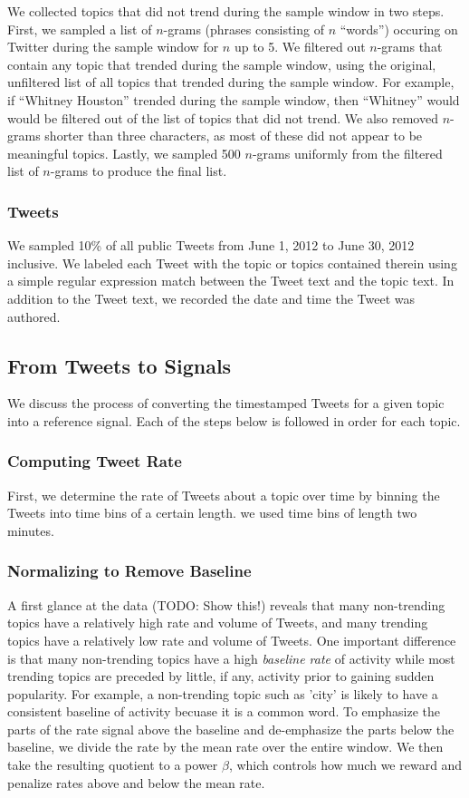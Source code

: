 We collected topics that did not trend during the sample window in two
steps. First, we sampled a list of $n$-grams (phrases consisting of $n$
``words'') occuring on Twitter during the sample window for $n$ up to 5. We
filtered out $n$-grams that contain any topic that trended during the sample
window, using the original, unfiltered list of all topics that trended during
the sample window. For example, if ``Whitney Houston'' trended during the sample
window, then ``Whitney'' would would be filtered out of the list of topics that
did not trend. We also removed $n$-grams shorter than three characters, as most
of these did not appear to be meaningful topics. Lastly, we sampled 500
$n$-grams uniformly from the filtered list of $n$-grams to produce the final
list.

\subsubsection{Tweets}
We sampled 10\% of all public Tweets from June 1, 2012 to June 30, 2012
inclusive. We labeled each Tweet with the topic or topics contained therein
using a simple regular expression match between the Tweet text and the topic
text. In addition to the Tweet text, we recorded the date and time the Tweet was
authored.

\subsection{From Tweets to Signals}
We discuss the process of converting the timestamped Tweets for a given topic
into a reference signal. Each of the steps below is followed in order for each
topic.

\subsubsection{Computing Tweet Rate}
First, we determine the rate of Tweets about a topic over time by binning the
Tweets into time bins of a certain length. we used time bins of length two
minutes. 

\subsubsection{Normalizing to Remove Baseline}
A first glance at the data (TODO: Show this!) reveals that many non-trending
topics have a relatively high rate and volume of Tweets, and many trending
topics have a relatively low rate and volume of Tweets. One important difference
is that many non-trending topics have a high {\em baseline rate} of activity
while most trending topics are preceded by little, if any, activity prior to
gaining sudden popularity. For example, a non-trending topic such as 'city' is
likely to have a consistent baseline of activity becuase it is a common word. To
emphasize the parts of the rate signal above the baseline and de-emphasize the
parts below the baseline, we divide the rate by the mean rate over the entire
window. We then take the resulting quotient to a power $\beta$, which controls
how much we reward and penalize rates above and below the mean rate.

